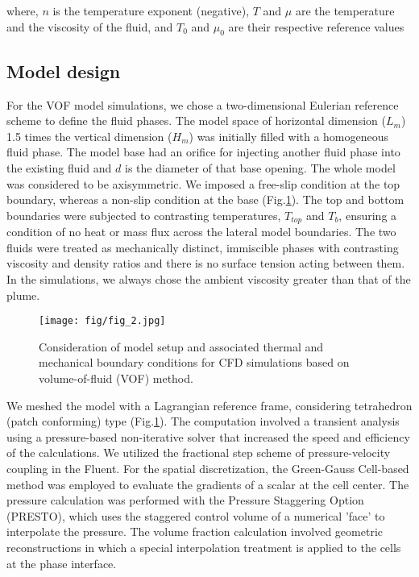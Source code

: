 \documentclass[12pt]{article}
\begin{document}
where, $n$ is the temperature exponent (negative), $T$ and $\mu$ are the temperature and the viscosity of the fluid, and  $T_0$  and  $\mu_0$ are their respective reference values




\subsection{Model design}
\label{sec:model}

For the VOF model simulations, we chose a two-dimensional Eulerian reference scheme to define the fluid phases. The model space of horizontal dimension ($L_m$) 1.5 times the vertical dimension ($H_m$) was initially filled with a homogeneous fluid phase. The model base had an orifice for injecting another fluid phase into the existing fluid and $d$ is the diameter of that base opening. The whole model was considered to be axisymmetric. We imposed a free-slip condition at the top boundary, whereas a non-slip condition at the base (Fig.\ref{fig:fig2}). The 
top and bottom boundaries were subjected to contrasting temperatures, $T_{top}$ and $T_b$, ensuring a condition of no heat or mass flux across the lateral model boundaries. The two fluids were treated as mechanically distinct, immiscible phases with contrasting viscosity and density ratios and there is no surface tension acting between them. In the simulations, we always chose the ambient viscosity greater than that of the plume. 

\begin{figure}[!htb]
 \begin{center}
{\texttt{[image: fig/fig\_2.jpg]} }
\caption{\small {Consideration of model setup and associated thermal and mechanical boundary conditions for CFD simulations based on volume-of-fluid (VOF) method.  }}
\label{fig:fig2}
 \end{center}
\end{figure}

We meshed the model with a Lagrangian reference frame, considering tetrahedron (patch conforming) 
type (Fig.\ref{fig:fig2}). The computation involved a transient analysis using a pressure-based non-iterative solver that increased the speed and efficiency of the calculations. We utilized the fractional step scheme of pressure-velocity coupling in the Fluent. For the spatial discretization, the Green-Gauss Cell-based method was employed to evaluate the gradients of a scalar at the cell center. The pressure calculation was performed with the Pressure Staggering Option (PRESTO), which uses the staggered control volume of a numerical 'face' to interpolate the pressure. The volume fraction calculation involved geometric reconstructions in which a special interpolation treatment is applied to the cells at the phase interface.
\end{document}
